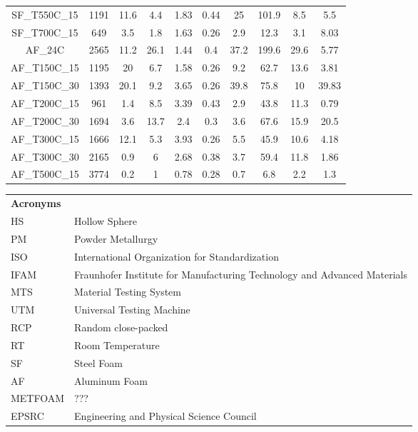 \documentclass[review]{elsarticle}
\begin{document}
{\begin{landscape}
\begin{table}[htbp]
\begin{tabular}{cccccccccc}
		SF\_T550C\_15 & 1191  & 11.6  & 4.4   & 1.83  & 0.44  & 25    & 101.9 & 8.5   & 5.5 \\
		SF\_T700C\_15 & 649   & 3.5   & 1.8   & 1.63  & 0.26  & 2.9   & 12.3  & 3.1   & 8.03 \\
		AF\_24C & 2565  & 11.2  & 26.1  & 1.44  & 0.4   & 37.2  & 199.6 & 29.6  & 5.77 \\
		AF\_T150C\_15 & 1195  & 20    & 6.7   & 1.58  & 0.26  & 9.2   & 62.7  & 13.6  & 3.81 \\
		AF\_T150C\_30 & 1393  & 20.1  & 9.2   & 3.65  & 0.26  & 39.8  & 75.8  & 10    & 39.83 \\
		AF\_T200C\_15 & 961   & 1.4   & 8.5   & 3.39  & 0.43  & 2.9   & 43.8  & 11.3  & 0.79 \\
		AF\_T200C\_30 & 1694  & 3.6   & 13.7  & 2.4   & 0.3   & 3.6   & 67.6  & 15.9  & 20.5 \\
		AF\_T300C\_15 & 1666  & 12.1  & 5.3   & 3.93  & 0.26  & 5.5   & 45.9  & 10.6  & 4.18 \\
		AF\_T300C\_30 & 2165  & 0.9   & 6     & 2.68  & 0.38  & 3.7   & 59.4  & 11.8  & 1.86 \\
		AF\_T500C\_15 & 3774  & 0.2   & 1     & 0.78  & 0.28  & 0.7   & 6.8   & 2.2   & 1.3 \\
		\bottomrule
	\end{tabular}%
	\label{Tab4}%
\end{table}%

\end{landscape}


\begin{table}[htbp]
    \begin{tabular}{ll}
    \textbf{Acronyms} \\
    HS    & Hollow Sphere \\
    PM    & Powder Metallurgy \\
    ISO   & International Organization for Standardization \\
    IFAM  & Fraunhofer Institute for Manufacturing Technology and Advanced Materials \\
    MTS   & Material Testing System \\
    UTM   & Universal Testing Machine \\
    RCP   & Random close-packed \\
    RT    & Room Temperature \\
    SF    & Steel Foam \\
    AF    & Aluminum Foam \\
    METFOAM & ??? \\
    EPSRC & Engineering and Physical Science Council \\
    \end{tabular}%
\end{table}%



}
\end{document}
